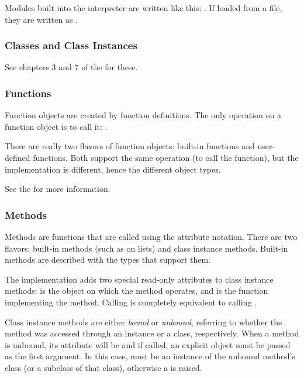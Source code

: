 Modules built into the interpreter are written like this:
.  If loaded from a file, they are
written as .


\subsubsection{Classes and Class Instances \label{typesobjects}}

See chapters 3 and 7 of the  for these.


\subsubsection{Functions \label{typesfunctions}}

Function objects are created by function definitions.  The only
operation on a function object is to call it:
.

There are really two flavors of function objects: built-in functions
and user-defined functions.  Both support the same operation (to call
the function), but the implementation is different, hence the
different object types.

See the  for more
information.

\subsubsection{Methods \label{typesmethods}}

Methods are functions that are called using the attribute notation.
There are two flavors: built-in methods (such as  on
lists) and class instance methods.  Built-in methods are described
with the types that support them.

The implementation adds two special read-only attributes to class
instance methods:  is the object on which the
method operates, and  is the function
implementing the method.  Calling  is completely equivalent to
calling .

Class instance methods are either \emph{bound} or \emph{unbound},
referring to whether the method was accessed through an instance or a
class, respectively.  When a method is unbound, its 
attribute will be  and if called, an explicit 
object must be passed as the first argument.  In this case,
 must be an instance of the unbound method's class (or a
subclass of that class), otherwise a  is raised.


